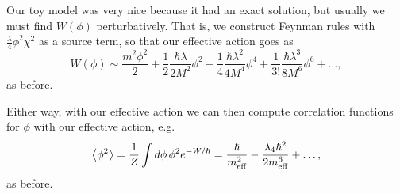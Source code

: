 Our toy model was very nice because it had an exact solution, but usually we must find $W(\phi)$ perturbatively. That is, we construct Feynman rules with $\frac{\lambda}{4}\phi^2 \chi^2$ as a source term, so that our effective action goes as
\begin{equation}
    W(\phi) \sim \frac{m^2 \phi^2}{2} +\frac{1}{2} \frac{\hbar \lambda}{2M^2} \phi^2 -\frac{1}{4} \frac{\hbar \lambda^2}{4M^4}\phi^4 + \frac{1}{3!} \frac{\hbar \lambda^3}{8M^6} \phi^6 + \ldots,
\end{equation}
as before.

Either way, with our effective action we can then compute correlation functions for $\phi$ with our effective action, e.g.
\begin{equation}
    \left< \phi^2 \right>=\frac{1}{Z}\int d\phi\, \phi^2 e^{-W/\hbar} =\frac{\hbar}{m_\text{eff}^2} -\frac{\lambda_4 \hbar^2}{2m_{\text{eff}}^6}+\ldots,
\end{equation}
as before.